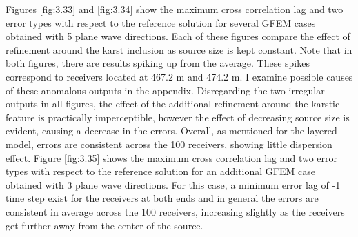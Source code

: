  Figures \ref{fig:3.33} and \ref{fig:3.34} show the maximum cross correlation lag and two error types with respect to the reference solution for several GFEM cases obtained with 5 plane wave directions. Each of these figures compare the effect of refinement around the karst inclusion as source size is kept constant. Note that in both figures, there are results spiking up from the average.  These spikes correspond to receivers located at 467.2 m and 474.2 m. I examine possible causes of these anomalous outputs in the appendix. Disregarding the two irregular outputs in all figures, the effect of the additional refinement around the karstic feature is practically imperceptible, however the effect of decreasing source size is evident, causing a decrease in the errors. Overall, as mentioned for the layered model, errors are consistent across the 100 receivers, showing little dispersion effect. 
 Figure \ref{fig:3.35} shows the maximum cross correlation lag and two error types with respect to the reference solution for an additional GFEM case obtained with 3 plane wave directions. For this case, a minimum error lag of -1 time step exist for the receivers at both ends and in general the errors are consistent in average across the 100 receivers, increasing slightly as the receivers get further away from the center of the source. 
 
